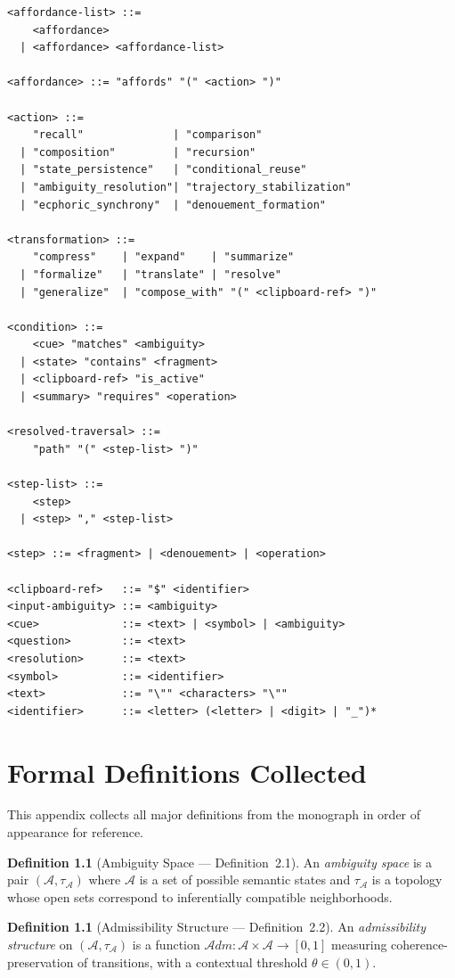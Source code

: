 \documentclass[12pt,oneside]{book}
\theoremstyle{plain}
\theoremstyle{definition}
\newtheorem{definition}[theorem]{Definition}
\theoremstyle{plain}
\newcommand{\cA}{\mathcal{A}}
\begin{document}
\begin{lstlisting}
<affordance-list> ::=
    <affordance>
  | <affordance> <affordance-list>

<affordance> ::= "affords" "(" <action> ")"

<action> ::=
    "recall"              | "comparison"
  | "composition"         | "recursion"
  | "state_persistence"   | "conditional_reuse"
  | "ambiguity_resolution"| "trajectory_stabilization"
  | "ecphoric_synchrony"  | "denouement_formation"

<transformation> ::=
    "compress"    | "expand"    | "summarize"
  | "formalize"   | "translate" | "resolve"
  | "generalize"  | "compose_with" "(" <clipboard-ref> ")"

<condition> ::=
    <cue> "matches" <ambiguity>
  | <state> "contains" <fragment>
  | <clipboard-ref> "is_active"
  | <summary> "requires" <operation>

<resolved-traversal> ::=
    "path" "(" <step-list> ")"

<step-list> ::=
    <step>
  | <step> "," <step-list>

<step> ::= <fragment> | <denouement> | <operation>

<clipboard-ref>   ::= "$" <identifier>
<input-ambiguity> ::= <ambiguity>
<cue>             ::= <text> | <symbol> | <ambiguity>
<question>        ::= <text>
<resolution>      ::= <text>
<symbol>          ::= <identifier>
<text>            ::= "\"" <characters> "\""
<identifier>      ::= <letter> (<letter> | <digit> | "_")*
\end{lstlisting}

\chapter{Formal Definitions Collected}
\label{app:definitions}

This appendix collects all major definitions from the monograph in order of appearance for reference.

\begin{definition}[Ambiguity Space --- Definition~2.1]
An \emph{ambiguity space} is a pair $(\cA, \tau_\cA)$ where $\cA$ is a set of possible semantic states and $\tau_\cA$ is a topology whose open sets correspond to inferentially compatible neighborhoods.
\end{definition}

\begin{definition}[Admissibility Structure --- Definition~2.2]
An \emph{admissibility structure} on $(\cA, \tau_\cA)$ is a function $\mathcal{A}dm : \cA \times \cA \to [0,1]$ measuring coherence-preservation of transitions, with a contextual threshold $\theta \in (0,1)$.
\end{definition}
\end{document}
